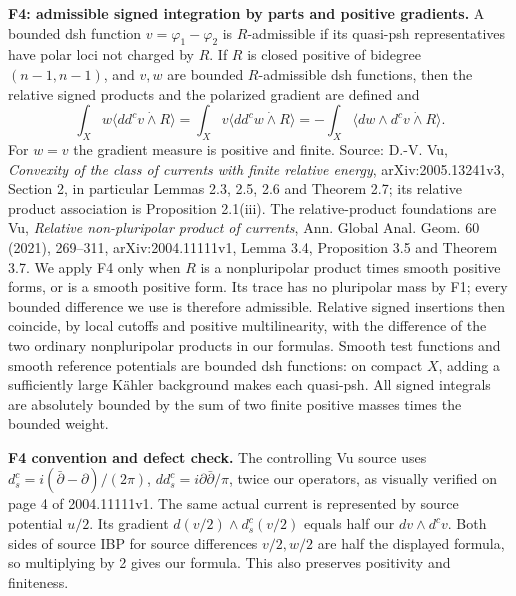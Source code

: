 \documentclass[
  10pt,
]{article}
\begin{document}
\textbf{F4: admissible signed integration by parts and positive
gradients.} A bounded dsh function \(v=\varphi_1-\varphi_2\) is
\(R\)-admissible if its quasi-psh representatives have polar loci not
charged by \(R\). If \(R\) is closed positive of bidegree \((n-1,n-1)\),
and \(v,w\) are bounded \(R\)-admissible dsh functions, then the
relative signed products and the polarized gradient are defined and \[
\int_X w\langle dd^cv\mathbin{\dot\wedge}R\rangle
=\int_X v\langle dd^cw\mathbin{\dot\wedge}R\rangle
=-\int_X\langle dw\wedge d^cv\mathbin{\dot\wedge}R\rangle.
\] For \(w=v\) the gradient measure is positive and finite. Source:
D.-V. Vu, \emph{Convexity of the class of currents with finite relative
energy}, arXiv:2005.13241v3, Section 2, in particular Lemmas 2.3, 2.5,
2.6 and Theorem 2.7; its relative product association is Proposition
2.1(iii). The relative-product foundations are Vu, \emph{Relative
non-pluripolar product of currents}, Ann. Global Anal. Geom. 60 (2021),
269--311, arXiv:2004.11111v1, Lemma 3.4, Proposition 3.5 and Theorem
3.7. We apply F4 only when \(R\) is a nonpluripolar product times smooth
positive forms, or is a smooth positive form. Its trace has no
pluripolar mass by F1; every bounded difference we use is therefore
admissible. Relative signed insertions then coincide, by local cutoffs
and positive multilinearity, with the difference of the two ordinary
nonpluripolar products in our formulas. Smooth test functions and smooth
reference potentials are bounded dsh functions: on compact \(X\), adding
a sufficiently large Kähler background makes each quasi-psh. All signed
integrals are absolutely bounded by the sum of two finite positive
masses times the bounded weight.

\textbf{F4 convention and defect check.} The controlling Vu source uses
\(d^c_s=i(\bar\partial-\partial)/(2\pi)\),
\(dd^c_s=i\partial\bar\partial/\pi\), twice our operators, as visually
verified on page 4 of 2004.11111v1. The same actual current is
represented by source potential \(u/2\). Its gradient
\(d(v/2)\wedge d^c_s(v/2)\) equals half our \(dv\wedge d^cv\). Both
sides of source IBP for source differences \(v/2,w/2\) are half the
displayed formula, so multiplying by 2 gives our formula. This also
preserves positivity and finiteness.
\end{document}
